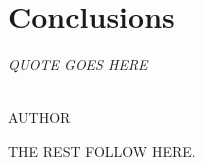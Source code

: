 \chapter{Conclusions}\label{chp:chp7}

\begin{flushright}
  {\em QUOTE GOES HERE }\\

\ \

\normalsize
{AUTHOR}  
\end{flushright}



THE REST FOLLOW HERE. 



